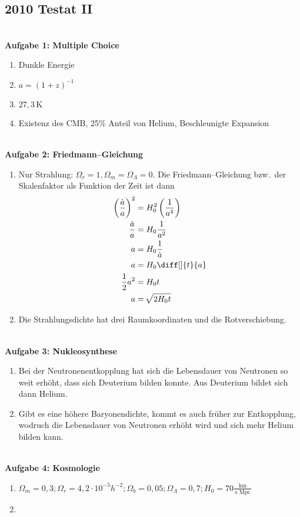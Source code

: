 \documentclass[a4paper,12pt]{article}
\numberwithin{equation}{section}
\begin{document}
\subsection{2010 Testat II}
\hfill\\\textbf{Aufgabe 1: Multiple Choice}
\begin{enumerate}[label=\arabic*.]
        \item Dunkle Energie
        \item $a=\left(1+z\right)^{-1}$ 
        \item $27,3\,\text{K}\,$ 
        \item Existenz des CMB, 25\% Anteil von Helium, Beschleunigte Expansion
\end{enumerate}
\hfill\\\textbf{Aufgabe 2: Friedmann--Gleichung}\\
\begin{enumerate}[label=\arabic*.]
        \item Nur Strahlung: $\Omega _r=1,\Omega _m=\Omega _\Lambda =0$. Die Friedmann--Gleichung bzw.\ der Skalenfaktor als Funktion der Zeit ist dann
        \begin{align*} 
                \left(\dfrac{\dot{a}}{a}\right)^2&=H_0^2\left(\dfrac{1}{a^4}\right)\\
                \dfrac{\dot{a}}{a}&=H_0\dfrac{1}{a^2}\\
                a&=H_0\dfrac{1}{\dot{a}}\\
                a&=H_0\diff[]{t}{a}\\
                \dfrac{1}{2}a^2&=H_0t\\
                a&=\,\sqrt[]{2H_0t}
        \end{align*} 
        \item \glqq{}Die Strahlungsdichte hat drei Raumkoordinaten und die Rotverschiebung.\grqq{}
\end{enumerate}
\hfill\\\textbf{Aufgabe 3: Nukleosynthese}
\begin{enumerate}[label=\arabic*.]
        \item Bei der Neutronenentkopplung hat sich die Lebensdauer von Neutronen so weit erhöht, dass sich Deuterium bilden konnte. Aus Deuterium bildet sich dann Helium.
        \item Gibt es eine höhere Baryonendichte, kommt es auch früher zur Entkopplung, wodruch die Lebensdauer von Neutronen erhöht wird und sich mehr Helium bilden kann.
\end{enumerate}
\hfill\\\textbf{Aufgabe 4: Kosmologie}
\begin{enumerate}[label=\arabic*.]
        \item $\Omega _m=0,3;\Omega _r=4,2\cdot 10^{-5}h^{-2};\Omega _b=0,05;\Omega _\Lambda =0,7;H_0=70\tfrac{\,\text{km}\,}{\,\text{s}\,\,\text{Mpc}\,}$
        \item 
\end{enumerate}
\end{document}
